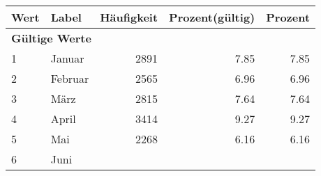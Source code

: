      \begin{longtable}{lXrrr}
     \toprule
     \textbf{Wert} & \textbf{Label} & \textbf{Häufigkeit} & \textbf{Prozent(gültig)} & \textbf{Prozent} \\
     \endhead
     \midrule
     \multicolumn{5}{l}{\textbf{Gültige Werte}}\\

     1 &
     \multicolumn{1}{X}{ Januar   } &


       \num{2891} &
       \num[round-mode=places,round-precision=2]{7.85} &
         \num[round-mode=places,round-precision=2]{7.85} \\

     2 &
     \multicolumn{1}{X}{ Februar   } &


       \num{2565} &
       \num[round-mode=places,round-precision=2]{6.96} &
         \num[round-mode=places,round-precision=2]{6.96} \\

     3 &
     \multicolumn{1}{X}{ März   } &


       \num{2815} &
       \num[round-mode=places,round-precision=2]{7.64} &
         \num[round-mode=places,round-precision=2]{7.64} \\

     4 &
     \multicolumn{1}{X}{ April   } &


       \num{3414} &
       \num[round-mode=places,round-precision=2]{9.27} &
         \num[round-mode=places,round-precision=2]{9.27} \\

     5 &
     \multicolumn{1}{X}{ Mai   } &


       \num{2268} &
       \num[round-mode=places,round-precision=2]{6.16} &
         \num[round-mode=places,round-precision=2]{6.16} \\

     6 &
     \multicolumn{1}{X}{ Juni   } &



\end{longtable}
